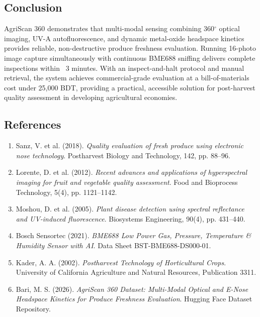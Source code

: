 \documentclass[11pt,a4paper]{article}
\begin{document}
\subsection{Conclusion}
AgriScan 360 demonstrates that multi-modal sensing combining 360$^\circ$ optical imaging, UV-A autofluorescence, and dynamic metal-oxide headspace kinetics provides reliable, non-destructive produce freshness evaluation. Running 16-photo image capture simultaneously with continuous BME688 sniffing delivers complete inspections within ~3 minutes. With an inspect-and-halt protocol and manual retrieval, the system achieves commercial-grade evaluation at a bill-of-materials cost under 25,000 BDT, providing a practical, accessible solution for post-harvest quality assessment in developing agricultural economies.

\subsection{References}
\begin{enumerate}[leftmargin=*]
    \item Sanz, V. et al. (2018). \textit{Quality evaluation of fresh produce using electronic nose technology}. Postharvest Biology and Technology, 142, pp. 88--96.
    \item Lorente, D. et al. (2012). \textit{Recent advances and applications of hyperspectral imaging for fruit and vegetable quality assessment}. Food and Bioprocess Technology, 5(4), pp. 1121--1142.
    \item Moshou, D. et al. (2005). \textit{Plant disease detection using spectral reflectance and UV-induced fluorescence}. Biosystems Engineering, 90(4), pp. 431--440.
    \item Bosch Sensortec (2021). \textit{BME688 Low Power Gas, Pressure, Temperature \& Humidity Sensor with AI}. Data Sheet BST-BME688-DS000-01.
    \item Kader, A. A. (2002). \textit{Postharvest Technology of Horticultural Crops}. University of California Agriculture and Natural Resources, Publication 3311.
    \item Bari, M. S. (2026). \textit{AgriScan 360 Dataset: Multi-Modal Optical and E-Nose Headspace Kinetics for Produce Freshness Evaluation}. Hugging Face Dataset Repository.
\end{enumerate}
\end{document}
